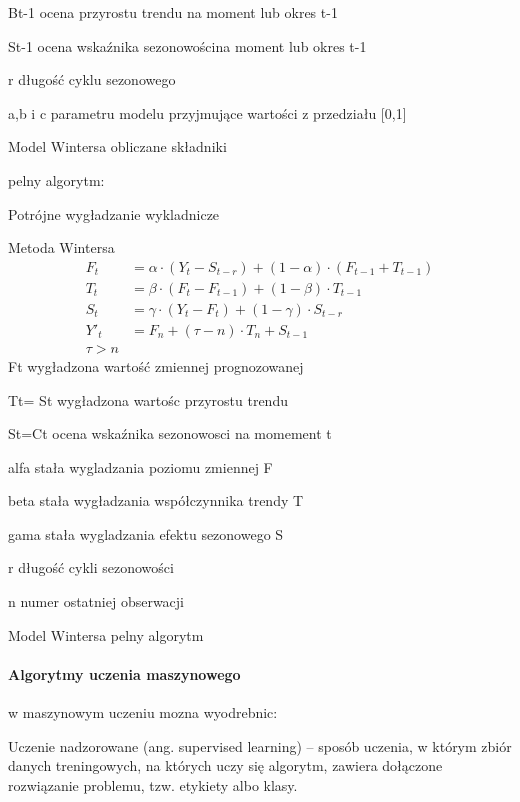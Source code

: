 Bt-1 ocena przyrostu trendu na moment lub okres t-1

St-1 ocena wskaźnika sezonowościna moment lub okres t-1

r długość cyklu sezonowego 

a,b i c  parametru modelu przyjmujące wartości z przedziału [0,1]

Model Wintersa  obliczane składniki \cite{win2023}

   \vspace{\baselineskip} 

pelny algorytm:


Potrójne wygładzanie wykladnicze 

Metoda Wintersa
\begin{align*}
F_t & = \alpha \cdot (Y_t - S_{t-r}) + (1 - \alpha) \cdot (F_{t-1} + T_{t-1}) \\
T_t & = \beta \cdot (F_t - F_{t-1}) + (1 - \beta) \cdot T_{t-1} \\
S_t & = \gamma \cdot (Y_t - F_t) + (1 - \gamma) \cdot S_{t-r}  \\
Y'_t & = F_n + (\tau - n) \cdot T_n + S_{t-1} \\
\tau > n
\end{align*}
Ft wygładzona wartość zmiennej prognozowanej

Tt= St wygładzona wartośc przyrostu trendu

St=Ct ocena wskaźnika sezonowosci na momement t

alfa  stała wygladzania poziomu zmiennej F

beta  stała wygładzania współczynnika trendy T

gama stała wygladzania efektu sezonowego S

r długość cykli sezonowości

n numer ostatniej obserwacji

Model Wintersa  pelny algorytm \cite{szer2009}




\newpage

\paragraph{Algorytmy uczenia maszynowego}


 w maszynowym uczeniu mozna wyodrebnic:
 
Uczenie nadzorowane (ang. supervised learning) – sposób uczenia, w którym zbiór danych treningowych, na których uczy się algorytm, zawiera dołączone rozwiązanie problemu, tzw. etykiety albo klasy. 

